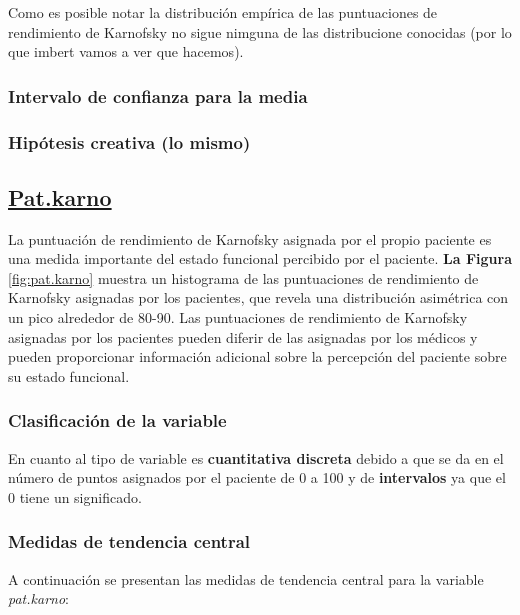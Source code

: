 \documentclass[a4paper,12pt]{article}
\begin{document}
    Como es posible notar la distribución empírica de las puntuaciones de rendimiento de Karnofsky no sigue nimguna de las distribucione conocidas (por lo que imbert vamos a ver que hacemos).

    \subsubsection*{Intervalo de confianza para la media}

    \subsubsection{Hipótesis creativa (lo mismo)}

    \subsection*{\underline{Pat.karno}}

    La puntuación de rendimiento de Karnofsky asignada por el propio paciente es una medida importante del estado funcional percibido por el paciente. \textbf{La Figura }\ref{fig:pat.karno} muestra un histograma de las puntuaciones de rendimiento de Karnofsky asignadas por los pacientes, que revela una distribución asimétrica con un pico alrededor de 80-90. Las puntuaciones de rendimiento de Karnofsky asignadas por los pacientes pueden diferir de las asignadas por los médicos y pueden proporcionar información adicional sobre la percepción del paciente sobre su estado funcional.

    \subsubsection*{Clasificación de la variable}

    En cuanto al tipo de variable es \textbf{cuantitativa discreta} debido a que se da en el número de puntos asignados por el paciente de 0 a 100 y de \textbf{intervalos} ya que el 0 tiene un significado.

    \subsubsection*{Medidas de tendencia central}

    A continuación se presentan las medidas de tendencia central para la variable \textit{pat.karno}:
    
\end{document}
